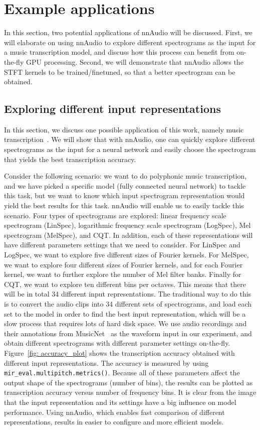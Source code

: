 \documentclass{ieeeaccess}
\newcommand{\nbh}[1]{\texttt{#1}}
\begin{document}
\section{Example applications}
In this section, two potential applications of nnAudio will be discussed. First, we will elaborate on using nnAudio to explore different spectrograms as the input for a music transcription model, and discuss how this process can benefit from on-the-fly GPU processing. Second, we will demonstrate that nnAudio allows the STFT kernels to be trained/finetuned, so that a better spectrogram can be obtained.


\subsection{Exploring different input representations}
In this section, we discuss one possible application of this work, namely music transcription~\cite{benetos2013automatic, holzapfel2019automatic}. We will show that with nnAudio, one can quickly explore different spectrograms as the input for a neural network and easily choose the spectrogram that yields the best transcription accuracy.

Consider the following scenario: we want to do polyphonic music transcription, and we have picked a specific model (fully connected neural network) to tackle this task, but we want to know which input spectrogram representation would yield the best results for this task. nnAudio will enable us to easily tackle this scenario. Four types of spectrograms are explored: linear frequency scale spectrogram (LinSpec), logarithmic frequency scale spectrogram (LogSpec), Mel spectrogram (MelSpec), and CQT. In addition, each of these representations will have different parameters settings that we need to consider. For LinSpec and LogSpec, we want to explore five different sizes of Fourier kernels. For MelSpec, we want to explore four different sizes of Fourier kernels, and for each Fourier kernel, we want to further explore the number of Mel filter banks. Finally for CQT, we want to explore ten different bins per octaves. This means that there will be in total 34 different input representations. The traditional way to do this is to convert the audio clips into 34 different sets of spectrograms, and load each set to the model in order to find the best input representation, which will be a slow process that requires lots of hard disk space. We use audio recordings and their annotations from MusicNet~\cite{thickstun2017learning, thickstun2018invariances} as the waveform input in our experiment, and obtain different spectrograms with different parameter settings on-the-fly. Figure~\ref{fig: accuracy_plot} shows the transcription accuracy obtained with different input representations. The accuracy is measured by using \nbh{mir\_eval.multipitch.metrics()}. Because all of these parameters affect the output shape of the spectrograms (number of bins), the results can be plotted as transcription accuracy versus number of frequency bins. It is clear from the image that the input representation and its settings have a big influence on model performance. Using nnAudio, which enables fast comparison of different representations, results in easier to configure and more efficient models. 
\end{document}
